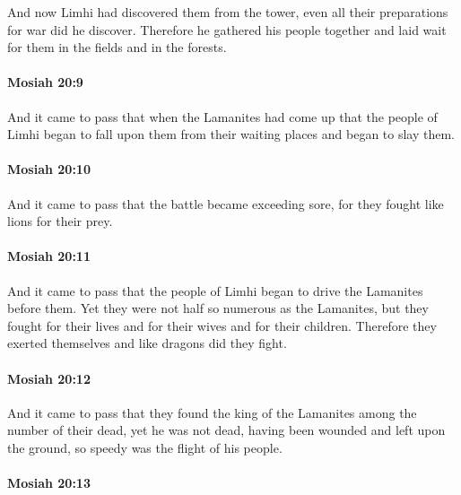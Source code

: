 			And now Limhi had discovered them from the tower,
			even all their preparations for war did he discover.
			Therefore he gathered his people together
			and laid wait for them in the fields and in the forests.

		\paragraph{Mosiah 20:9} %
			\label{MOSIAH-20-9}

			And it came to pass that when the Lamanites had come up
			that the people of Limhi began to fall upon them from their waiting places
			and began to slay them.

		\paragraph{Mosiah 20:10} %
			\label{MOSIAH-20-10}

			And it came to pass that the battle became exceeding sore,
			for they fought like lions for their prey.

		\paragraph{Mosiah 20:11} %
			\label{MOSIAH-20-11}

			And it came to pass that
			the people of Limhi began to drive the Lamanites before them.
			Yet they were not half so numerous as the Lamanites,
			but they fought for their lives and for their wives and for their children.
			Therefore they exerted themselves and like dragons did they fight.

		\paragraph{Mosiah 20:12} %
			\label{MOSIAH-20-12}

			And it came to pass that they found the king of the Lamanites
			among the number of their dead,
			yet he was not dead,
			having been wounded and left upon the ground,
			so speedy was the flight of his people.

		\paragraph{Mosiah 20:13} %
			\label{MOSIAH-20-13}

